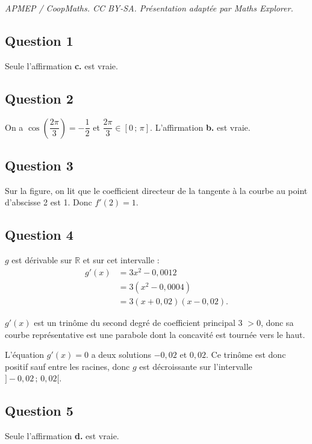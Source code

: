 \documentclass[10pt]{article}
\begin{document}
\noindent\textit{APMEP / CoopMaths. CC BY-SA. Présentation adaptée par Maths Explorer.}\par\medskip
\subsection*{Question 1}

Seule l'affirmation \textbf{c.} est vraie.

\subsection*{Question 2}

On a \( \cos\left(\dfrac{2\pi}{3}\right) = -\dfrac{1}{2} \) et \( \dfrac{2\pi}{3} \in [0 \,;\, \pi] \). L'affirmation \textbf{b.} est vraie.

\subsection*{Question 3}

Sur la figure, on lit que le coefficient directeur de la tangente à la courbe au point d'abscisse 2 est 1. Donc \( f'(2) = 1 \).

\subsection*{Question 4}

\( g \) est dérivable sur \( \mathbb{R} \) et sur cet intervalle :
\begin{align*}
g'(x) &= 3x^2 - 0{,}0012 \\
&= 3\left(x^2 - 0{,}0004\right) \\
&= 3(x + 0{,}02)(x - 0{,}02).
\end{align*}

\( g'(x) \) est un trinôme du second degré de coefficient principal 3 \(> 0\), donc sa courbe représentative est une parabole dont la concavité est tournée vers le haut.

L'équation \( g'(x) = 0 \) a deux solutions \( -0{,}02 \) et \( 0{,}02 \). Ce trinôme est donc positif sauf entre les racines, donc \( g \) est décroissante sur l'intervalle \( ]-0{,}02 \,;\, 0{,}02[ \).

\subsection*{Question 5}

Seule l'affirmation \textbf{d.} est vraie.
\end{document}
